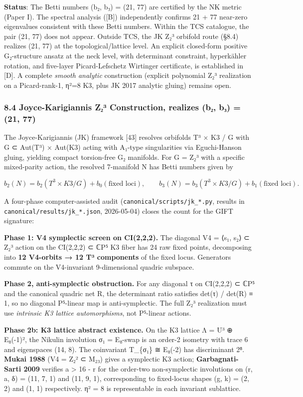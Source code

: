 \documentclass[11pt,a4paper]{article}
\begin{document}
{{{{{{{{{{{{{{{\textbf{Status}: The Betti numbers (b₂, b₃) = (21, 77) are certified by the NK metric (Paper I). The spectral analysis ([B]) independently confirms 21 + 77 near-zero eigenvalues consistent with these Betti numbers. Within the TCS catalogue, the pair (21, 77) does not appear. Outside TCS, the JK Z₂³ orbifold route (§8.4) realizes (21, 77) at the topological/lattice level. An explicit closed-form positive G₂-structure ansatz at the neck level, with determinant constraint, hyperkähler rotation, and five-layer Picard-Lefschetz Wirtinger certificate, is established in [D]. A complete \emph{smooth analytic} construction (explicit polynomial Z₂³ realization on a Picard-rank-1, η²=8 K3, plus JK 2017 analytic gluing) remains open.

\subsubsection{8.4 Joyce-Karigiannis Z₂³ Construction, realizes (b₂, b₃) = (21, 77)}\label{joyce-karigiannis-zux2082uxb3-construction-realizes-bux2082-bux2083-21-77}

The Joyce-Karigiannis (JK) framework [43] resolves orbifolds T³ × K3 / G with G ⊂ Aut(T³) × Aut(K3) acting with A₁-type singularities via Eguchi-Hanson gluing, yielding compact torsion-free G₂ manifolds. For G = Z₂³ with a specific mixed-parity action, the resolved 7-manifold N has Betti numbers given by

\[b_2(N) = b_2(T^3 \times K3 / G) + b_0(\text{fixed loci}), \qquad b_3(N) = b_3(T^3 \times K3 / G) + b_1(\text{fixed loci}).\]

A four-phase computer-assisted audit (\texttt{canonical/scripts/jk\_*.py}, results in \texttt{canonical/results/jk\_*.json}, 2026-05-04) closes the count for the GIFT signature:

\textbf{Phase 1: V4 symplectic screen on CI(2,2,2).} The diagonal V4 = ⟨s₁, s₂⟩ ⊂ Z₂³ action on the CI(2,2,2) ⊂ ℂP⁵ K3 fiber has 24 raw fixed points, decomposing into \textbf{12 V4-orbits → 12 T³ components} of the fixed locus. Generators commute on the V4-invariant 9-dimensional quadric subspace.

\textbf{Phase 2, anti-symplectic obstruction.} For any diagonal τ on CI(2,2,2) ⊂ ℂP⁵ and the canonical quadric net R, the determinant ratio satisfies det(τ) / det(R) ≡ 1, so no diagonal P⁵-linear map is anti-symplectic. The full Z₂³ realization must use \emph{intrinsic K3 lattice automorphisms}, not P⁵-linear actions.

\textbf{Phase 2b: K3 lattice abstract existence.} On the K3 lattice Λ = U³ ⊕ E₈(-1)², the Nikulin involution σ₁ = E₈-swap is an order-2 isometry with trace 6 and eigenspaces (14, 8). The coinvariant T\_\{σ₁\} ≅ E₈(-2) has discriminant 2⁸. \textbf{Mukai 1988} (V4 = Z₂² ⊂ M₂₃) gives a symplectic K3 action; \textbf{Garbagnati-Sarti 2009} verifies a \textgreater{} 16 - r for the order-two non-symplectic involutions on (r, a, δ) = (11, 7, 1) and (11, 9, 1), corresponding to fixed-locus shapes (g, k) = (2, 2) and (1, 1) respectively. η² = 8 is representable in each invariant sublattice.

}}}}}}}}}}}}}}}
\end{document}
